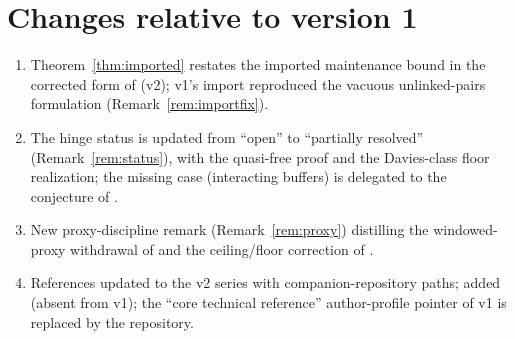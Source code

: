 \documentclass[11pt,a4paper]{article}
\theoremstyle{plain}
\theoremstyle{definition}
\theoremstyle{remark}
\begin{document}
\appendix

\section{Changes relative to version 1}

\begin{enumerate}
\item Theorem~\ref{thm:imported} restates the imported maintenance bound in
the corrected form of \cite{MaintWork} (v2); v1's import reproduced the
vacuous unlinked-pairs formulation (Remark~\ref{rem:importfix}).
\item The hinge status is updated from ``open'' to ``partially resolved''
(Remark~\ref{rem:status}), with the quasi-free proof and the Davies-class
floor realization; the missing case (interacting buffers) is delegated to the
conjecture of \cite{HCut}.
\item New proxy-discipline remark (Remark~\ref{rem:proxy}) distilling the
windowed-proxy withdrawal of \cite{HCut} and the ceiling/floor correction of
\cite{Stress}.
\item References updated to the v2 series with companion-repository paths;
\cite{Stress} added (absent from v1); the ``core technical reference''
author-profile pointer of v1 is replaced by the repository.
\end{enumerate}
\end{document}

